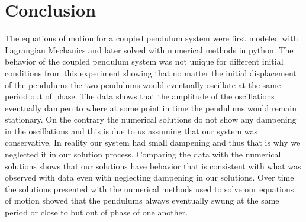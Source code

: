 \documentclass[twocolumn]{article}
\begin{document}
\section*{Conclusion}
The equations of motion for a coupled pendulum system were first modeled with Lagrangian Mechanics and later solved with numerical methods in python. The behavior of the coupled pendulum system was not unique for different initial conditions from this experiment showing that no matter the initial displacement of the pendulums the two pendulums would eventually oscillate at the same period out of phase. The data shows that the amplitude of the oscillations eventually dampen to where at some point in time the pendulums would remain stationary. On the contrary the numerical solutions do not show any dampening in the oscillations and this is due to us assuming that our system was conservative. In reality our system had small dampening and thus that is why we neglected it in our solution process. Comparing the data with the numerical solutions shows that our solutions have behavior that is consistent with what was observed with data even with neglecting dampening in our solutions. Over time the solutions presented with the numerical methods used to solve our equations of motion showed that the pendulums always eventually swung at the same period or close to but out of phase of one another.
\newpage
\end{document}
